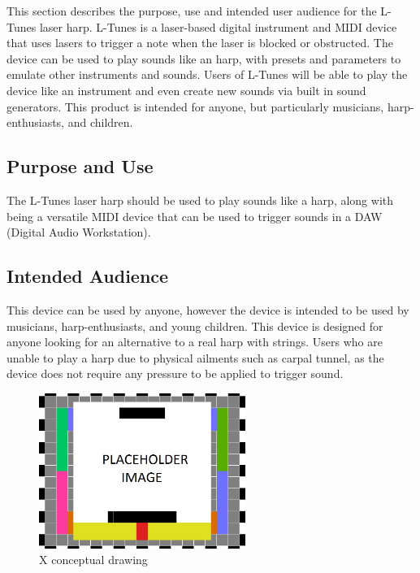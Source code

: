 This section describes the purpose, use and intended user audience for the L-Tunes laser harp. L-Tunes is a laser-based digital instrument and MIDI device that uses lasers to trigger a note when the laser is blocked or obstructed. The device can be used to play sounds like an harp, with presets and parameters to emulate other instruments and sounds. Users of L-Tunes will be able to play the device like an instrument and even create new sounds via built in sound generators. This product is intended for anyone, but particularly musicians, harp-enthusiasts, and children. 

\subsection{Purpose and Use}
The L-Tunes laser harp should be used to play sounds like a harp, along with being a versatile MIDI device that can be used to trigger sounds in a DAW (Digital Audio Workstation). 

\subsection{Intended Audience}
This device can be used by anyone, however the device is intended to be used by musicians, harp-enthusiasts, and young children. This device is designed for  anyone looking for an alternative to a real harp with strings. Users who are unable to play a harp due to physical ailments such as carpal tunnel, as the device does not require any pressure to be applied to trigger sound. 

\begin{figure}[h!]
	\centering
   	\includegraphics[width=0.60\textwidth]{images/test_image}
    \caption{X conceptual drawing}
\end{figure}
